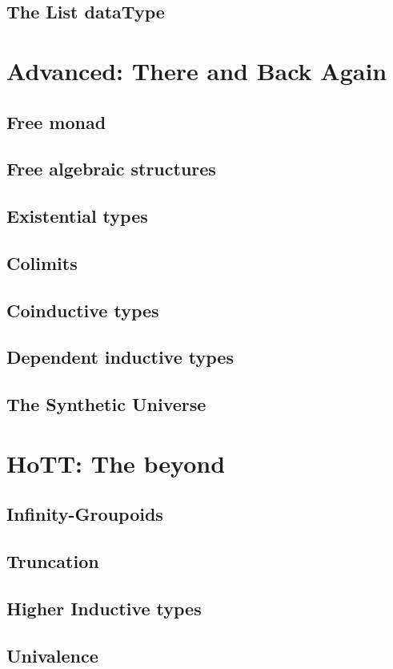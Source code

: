 \documentclass[11pt,oneside]{article}
\begin{document}
\subsection{The List dataType}

\section{Advanced: There and Back Again}
\subsection{Free monad}
\subsection{Free algebraic structures}
\subsection{Existential types}
\subsection{Colimits}
\subsection{Coinductive types}
\subsection{Dependent inductive types}
\subsection{The Synthetic Universe}

\section{HoTT: The beyond}
\subsection{Infinity-Groupoids}
\subsection{Truncation}
\subsection{Higher Inductive types}
\subsection{Univalence}
\end{document}
